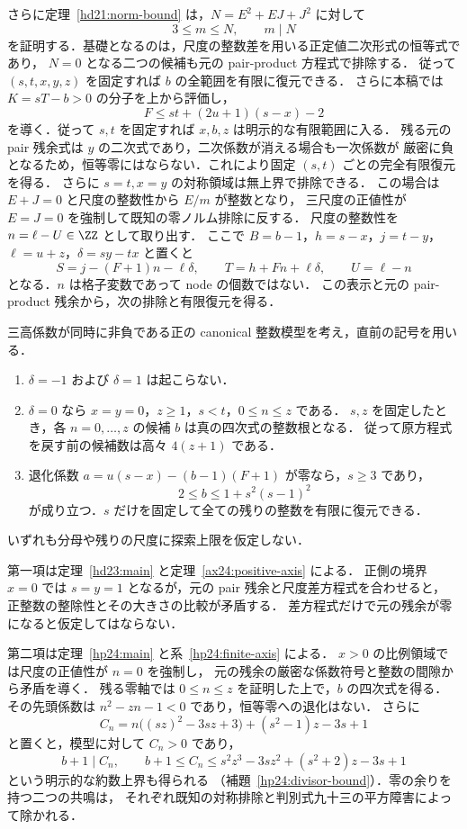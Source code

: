 さらに定理~\ref{hd21:norm-bound} は，$N=E^2+EJ+J^2$ に対して
\[
 3\le m\le N,\qquad m\mid N
\]
を証明する．基礎となるのは，尺度の整数差を用いる正定値二次形式の恒等式であり，
$N=0$ となる二つの候補も元の pair-product 方程式で排除する．
従って $(s,t,x,y,z)$ を固定すれば $b$ の全範囲を有限に復元できる．
さらに本稿では $K=sT-b>0$ の分子を上から評価し，
\[
 F\le st+(2u+1)(s-x)-2
\]
を導く．従って $s,t$ を固定すれば $x,b,z$ は明示的な有限範囲に入る．
残る元の pair 残余式は $y$ の二次式であり，二次係数が消える場合も一次係数が
厳密に負となるため，恒等零にはならない．これにより固定 $(s,t)$ ごとの完全有限復元を得る．
さらに $s=t,x=y$ の対称領域は無上界で排除できる．
この場合は $E+J=0$ と尺度の整数性から $E/m$ が整数となり，
三尺度の正値性が $E=J=0$ を強制して既知の零ノルム排除に反する．
尺度の整数性を $n=\ell-U\in\ZZ$ として取り出す．
ここで $B=b-1$，$h=s-x$，$j=t-y$，$\ell=u+z$，$\delta=sy-tx$ と置くと
\[
 S=j-(F+1)n-\ell\delta,\qquad
 T=h+Fn+\ell\delta,\qquad U=\ell-n
\]
となる．$n$ は格子変数であって node の個数ではない．
この表示と元の pair-product 残余から，次の排除と有限復元を得る．

\begin{theorem}
\label{ar24:high-D-reductions}
三高係数が同時に非負である正の canonical 整数模型を考え，直前の記号を用いる．
\begin{enumerate}
\item $\delta=-1$ および $\delta=1$ は起こらない．
\item $\delta=0$ なら $x=y=0$，$z\ge1$，$s<t$，$0\le n\le z$ である．
$s,z$ を固定したとき，各 $n=0,\ldots,z$ の候補 $b$ は真の四次式の整数根となる．
従って原方程式を戻す前の候補数は高々 $4(z+1)$ である．
\item 退化係数 $a=u(s-x)-(b-1)(F+1)$ が零なら，$s\ge3$ であり，
\[
 2\le b\le1+s^2(s-1)^2
\]
が成り立つ．$s$ だけを固定して全ての残りの整数を有限に復元できる．
\end{enumerate}
いずれも分母や残りの尺度に探索上限を仮定しない．
\end{theorem}

第一項は定理~\ref{hd23:main} と定理~\ref{ax24:positive-axis} による．
正側の境界 $x=0$ では $s=y=1$ となるが，元の pair 残余と尺度差方程式を合わせると，
正整数の整除性とその大きさの比較が矛盾する．
差方程式だけで元の残余が零になると仮定してはならない．

第二項は定理~\ref{hp24:main} と系~\ref{hp24:finite-axis} による．
$x>0$ の比例領域では尺度の正値性が $n=0$ を強制し，
元の残余の厳密な係数符号と整数の間隙から矛盾を導く．
残る零軸では $0\le n\le z$ を証明した上で，$b$ の四次式を得る．
その先頭係数は $n^2-zn-1<0$ であり，恒等零への退化はない．
さらに
\[
 C_n=n\bigl((sz)^2-3sz+3\bigr)+(s^2-1)z-3s+1
\]
と置くと，模型に対して $C_n>0$ であり，
\[
 b+1\mid C_n,\qquad
 b+1\le C_n\le s^2z^3-3sz^2+(s^2+2)z-3s+1
\]
という明示的な約数上界も得られる
（補題~\ref{hp24:divisor-bound}）．零の余りを持つ二つの共鳴は，
それぞれ既知の対称排除と判別式九十三の平方障害によって除かれる．

